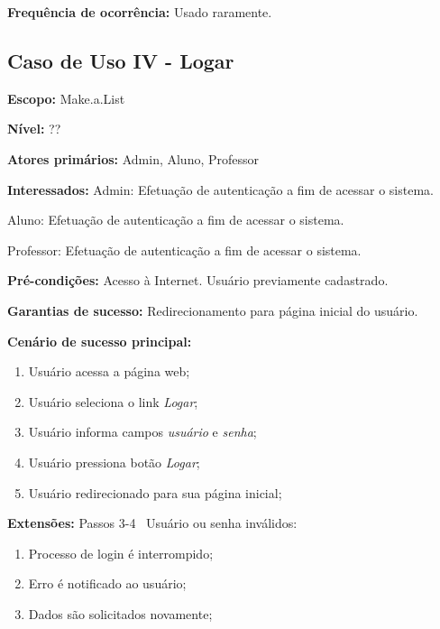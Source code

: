 \documentclass[12pt,oneside,a4paper,article]{abntex2}
\begin{document}
		\textbf{Frequência de ocorrência:} Usado raramente.
		
		\subsection{Caso de Uso IV - Logar}
		
		\textbf{Escopo:} Make.a.List 
		
		\textbf{Nível:} ??
		
		\textbf{Atores primários:} Admin, Aluno, Professor
		
		\textbf{Interessados:} Admin: Efetuação de autenticação a fim de acessar o sistema. 
		
		Aluno: Efetuação de autenticação a fim de acessar o sistema.
		
		Professor: Efetuação de autenticação a fim de acessar o sistema.
		
		\textbf{Pré-condições:} Acesso à Internet. Usuário previamente cadastrado.
		
		\textbf{Garantias de sucesso:} Redirecionamento para página inicial do usuário.
		
		\textbf{Cenário de sucesso principal:}
		
		\begin{enumerate}
			\item Usuário acessa a página web;
			
			\item Usuário seleciona o link \textit{Logar};
			
			\item Usuário informa campos \textit{usuário} e \textit{senha};
			
			\item Usuário pressiona botão \textit{Logar};
			
			\item Usuário redirecionado para sua página inicial;
			
		\end{enumerate}
		
		\textbf{Extensões:} Passos 3-4 \textrightarrow \ Usuário ou senha inválidos:
		
		\begin{enumerate}[label=\alph*.]	
			\item Processo de login é interrompido;
			\item Erro é notificado ao usuário;
			\item Dados são solicitados novamente;
		\end{enumerate}
		
\end{document}
